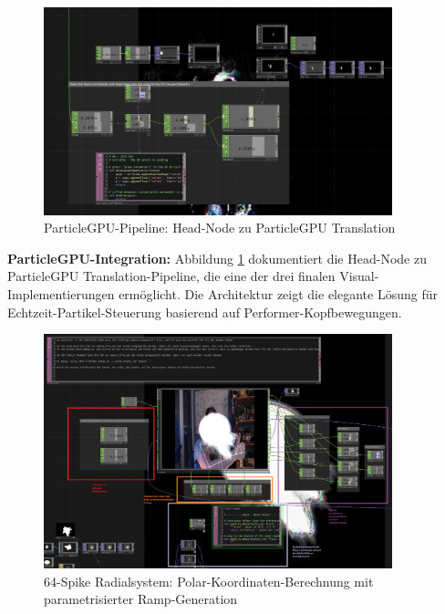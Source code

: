 \begin{figure}[H]
    \centering
    \includegraphics[width=0.9\textwidth]{images/docupictures/NoisyBlob_HEAD_to_ParticleGPU_Translate.png}
    \caption{ParticleGPU-Pipeline: Head-Node zu ParticleGPU Translation}
    \label{fig:particle_translation}
\end{figure}

\textbf{ParticleGPU-Integration:}
Abbildung \ref{fig:particle_translation} dokumentiert die Head-Node zu ParticleGPU Translation-Pipeline, die eine der drei finalen Visual-Implementierungen ermöglicht. Die Architektur zeigt die elegante Lösung für Echtzeit-Partikel-Steuerung basierend auf Performer-Kopfbewegungen.

\begin{figure}[H]
    \centering
    \includegraphics[width=0.9\textwidth]{images/docupictures/TopDown_KreisZuRampsParametisierteBerechnungen.png}
    \caption{64-Spike Radialsystem: Polar-Koordinaten-Berechnung mit parametrisierter Ramp-Generation}
    \label{fig:radial_spike_system}
\end{figure}

